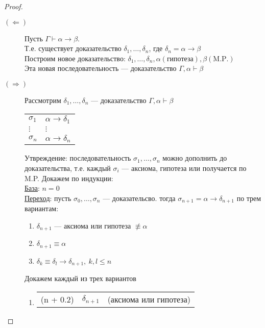 \documentclass[english]{article}
\begin{document}
\begin{proof}
	\-
	\begin{description}
		\item[{\((\Leftarrow)\)}] Пусть \(\Gamma \vdash \alpha \to \beta\). \\
			Т.е. существует доказательство \(\delta_1, \dots, \delta_n\), где \(\delta_n = \alpha \to \beta\) \\
			Построим новое доказательство: \(\delta_1, \dots, \delta_n, \alpha(\text{гипотеза}), \beta(\text{M.P.})\) \\
			Эта новая последовательность --- доказательство \(\Gamma, \alpha \vdash \beta\)
		\item[{\((\Rightarrow)\)}] Рассмотрим \(\delta_1, \dots, \delta_n\) --- доказательство \(\Gamma, \alpha \vdash \beta\)
			\begin{center}
				\begin{tabular}{ll}
					\(\sigma_1\) & \(\alpha \to \delta_1\) \\
					\(\vdots\)   & \(\vdots\)              \\
					\(\sigma_n\) & \(\alpha \to \delta_n\) \\
				\end{tabular}
			\end{center}
			Утвреждение: последовательность \(\sigma_1, \dots, \sigma_n\) можно дополнить до доказательства, т.е. каждый \(\sigma_i\) --- аксиома, гипотеза или получается по M.P. Докажем по индукции: \\
			\uline{База}: \(n = 0\) \\
			\uline{Переход}: пусть \(\sigma_0, \dots, \sigma_n\) --- доказательсво. тогда \(\sigma_{n + 1} = \alpha \to \delta_{n + 1}\) по трем вариантам:
			\begin{enumerate}
				\item \(\delta_{n + 1}\) --- аксиома или гипотеза \(\not\equiv \alpha\)
				\item \(\delta_{n + 1} \equiv \alpha\)
				\item \(\delta_k \equiv \delta_l \to \delta_{n + 1},\ k,l\le n\)
			\end{enumerate}
			Докажем каждый из трех вариантов
			\begin{enumerate}
				\item \-
				      \begin{center}
					      \begin{tabular}{l|ll}
						      (n + 0.2) & \(\delta_{n + 1}\)                              & (аксиома или гипотеза)      \\

\end{tabular}
\end{center}
\end{enumerate}
\end{description}
\end{proof}
\end{document}
